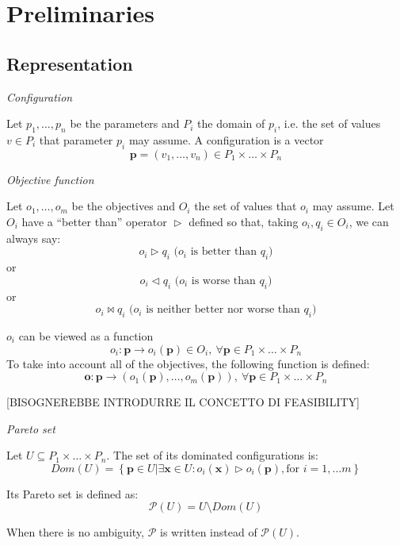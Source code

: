 
\section{Preliminaries}

\subsection{Representation}
\begin{defn}
\emph{Configuration}

Let $p_{1},\dots,p_{n}$ be the parameters and $P_{i}$ the domain
of $p_{i}$, i.e. the set of values $v\in P_{i}$ that parameter $p_{i}$
may assume. A configuration is a vector
\[
\mathbf{p}=\left(v_{1},\dots,v_{n}\right)\in P_{1}\times\dots\times P_{n}
\]

\end{defn}

\begin{defn}
\emph{Objective function}

Let $o_{1},\dots,o_{m}$ be the objectives and $O_{i}$ the set of
values that $o_{i}$ may assume. Let $O_{i}$ have a ``better than''
operator $\vartriangleright$ defined so that, taking $o_{i},q_{i}\in O_{i}$,
we can always say:
\[
o_{i}\vartriangleright q_{i}\mbox{ (}o_{i}\mbox{ is better than }q_{i}\mbox{)}
\]
 or
\[
o_{i}\vartriangleleft q_{i}\mbox{ (}o_{i}\mbox{ is worse than }q_{i}\mbox{)}
\]
 or
\[
o_{i}\bowtie q_{i}\mbox{ (}o_{i}\mbox{ is neither better nor worse than }q_{i}\mbox{)}
\]


$o_{i}$ can be viewed as a function
\[
o_{i}:\mathbf{p}\rightarrow o_{i}\left(\mathbf{p}\right)\in O_{i},\ \forall\mathbf{p}\in P_{1}\times\dots\times P_{n}
\]
 To take into account all of the objectives, the following function
is defined:
\[
\mathbf{o}:\mathbf{p}\rightarrow\left(o_{1}\left(\mathbf{p}\right),\dots,o_{m}\left(\mathbf{p}\right)\right),\ \forall\mathbf{p}\in P_{1}\times\dots\times P_{n}
\]

\end{defn}


{[}BISOGNEREBBE INTRODURRE IL CONCETTO DI FEASIBILITY{]}
\begin{defn}
\emph{\label{pers02.def:Pareto-set}Pareto set}

Let $U\subseteq P_{1}\times\dots\times P_{n}$. The set of its dominated
configurations is:
\[
Dom\left(U\right)=\left\{ \left.\mathbf{p}\in U\right|\exists\mathbf{x}\in U:o_{i}\left(\mathbf{x}\right)\vartriangleright o_{i}\left(\mathbf{p}\right),\mbox{for }i=1,\dots m\right\} 
\]


Its Pareto set is defined as:
\[
\mathscr{P}\left(U\right)=U\setminus Dom\left(U\right)
\]


When there is no ambiguity, $\mathscr{P}$ is written instead of $\mathscr{P}\left(U\right)$.
\end{defn}

